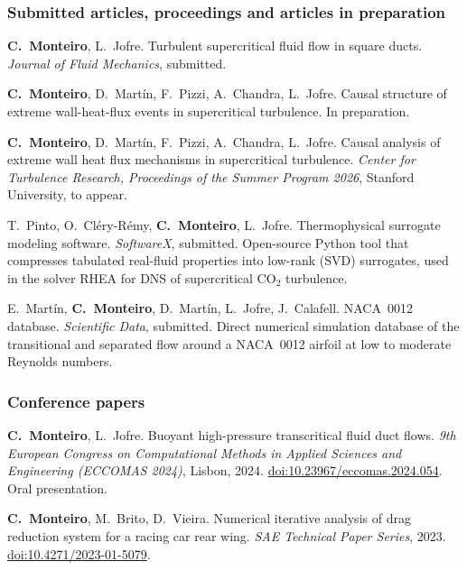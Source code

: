 \documentclass[11pt]{article}
\begin{document}
\subsubsection*{Submitted articles, proceedings and articles in preparation}
\begin{enumerate}[label={[R\arabic*]}, itemsep=0pt]
  \item \hypertarget{pub-R1}{}\textbf{C.\ Monteiro}, L.\ Jofre. Turbulent supercritical fluid flow in
  square ducts. \emph{Journal of Fluid Mechanics}, submitted.
  \item \hypertarget{pub-R2}{}\textbf{C.\ Monteiro}, D.\ Mart\'in, F.\ Pizzi, A.\ Chandra, L.\ Jofre. Causal structure of extreme
  wall-heat-flux events in supercritical turbulence. In preparation.
  \item \hypertarget{pub-R3}{}\textbf{C.\ Monteiro}, D.\ Mart\'in, F.\ Pizzi, A.\ Chandra, L.\ Jofre.
  Causal analysis of extreme wall heat flux mechanisms in supercritical turbulence.
  \emph{Center for Turbulence Research, Proceedings of the Summer Program 2026}, Stanford
  University, to appear.
  \item \hypertarget{pub-R4}{}T.\ Pinto, O.\ Cl\'ery-R\'emy, \textbf{C.\ Monteiro}, L.\ Jofre.
  Thermophysical surrogate modeling software. \emph{SoftwareX}, submitted. Open-source
  Python tool that compresses tabulated real-fluid properties into low-rank (SVD)
  surrogates, used in the solver RHEA for DNS of supercritical CO$_2$ turbulence.
  \item \hypertarget{pub-R5}{}E.\ Mart\'in, \textbf{C.\ Monteiro}, D.\ Mart\'in, L.\ Jofre,
  J.\ Calafell. NACA~0012 database. \emph{Scientific Data}, submitted. Direct numerical
  simulation database of the transitional and separated flow around a NACA~0012 airfoil at
  low to moderate Reynolds numbers.
\end{enumerate}

\subsubsection*{Conference papers}
\begin{enumerate}[label={[C\arabic*]}, itemsep=0pt]
  \item \hypertarget{pub-C1}{}\textbf{C.\ Monteiro}, L.\ Jofre. Buoyant high-pressure transcritical fluid duct
  flows. \emph{9th European Congress on Computational Methods in Applied Sciences and
  Engineering (ECCOMAS 2024)}, Lisbon, 2024.
  \href{https://doi.org/10.23967/eccomas.2024.054}{doi:10.23967/eccomas.2024.054}. Oral presentation.
  \item \hypertarget{pub-C2}{}\textbf{C.\ Monteiro}, M.\ Brito, D.\ Vieira. Numerical iterative analysis of drag
  reduction system for a racing car rear wing. \emph{SAE Technical Paper Series}, 2023.
  \href{https://doi.org/10.4271/2023-01-5079}{doi:10.4271/2023-01-5079}.
\end{enumerate}
\end{document}
